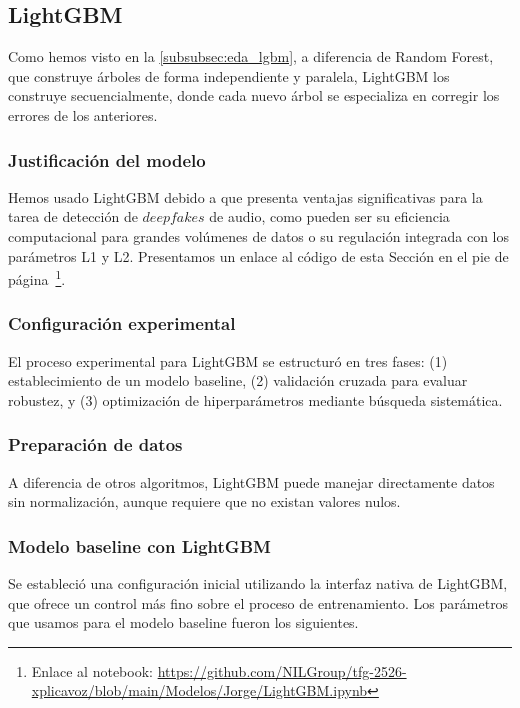 \subsection{LightGBM}
\label{subsubsec:mod_lgbm}

Como hemos visto en la \autoref{subsubsec:eda_lgbm}, a diferencia de Random Forest, que construye árboles de forma independiente y paralela, LightGBM los construye secuencialmente, donde cada nuevo árbol se especializa en corregir los errores de los anteriores.

\subsubsection*{Justificación del modelo}

Hemos usado LightGBM debido a que presenta ventajas significativas para la tarea de detección de $deepfakes$ de audio, como pueden ser su eficiencia computacional para grandes volúmenes de datos o su regulación integrada con los parámetros L1 y L2. Presentamos un enlace al código de esta Sección en el pie de página~\footnote{Enlace al notebook: \url{https://github.com/NILGroup/tfg-2526-xplicavoz/blob/main/Modelos/Jorge/LightGBM.ipynb}}.

\subsubsection*{Configuración experimental}

El proceso experimental para LightGBM se estructuró en tres fases: (1) establecimiento de un modelo baseline, (2) validación cruzada para evaluar robustez, y (3) optimización de hiperparámetros mediante búsqueda sistemática.

\subsubsection*{Preparación de datos}
A diferencia de otros algoritmos, LightGBM puede manejar directamente datos sin normalización, aunque requiere que no existan valores nulos.

\subsubsection*{Modelo baseline con LightGBM}
Se estableció una configuración inicial utilizando la interfaz nativa de LightGBM, que ofrece un control más fino sobre el proceso de entrenamiento. Los parámetros que usamos para el modelo baseline fueron los siguientes.

